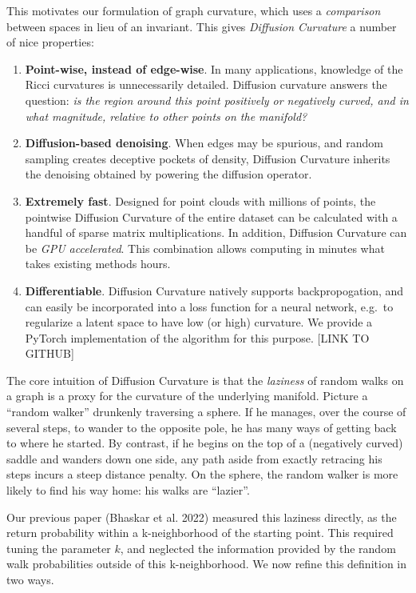\documentclass[
  letterpaper,
  DIV=11,
  numbers=noendperiod]{scrartcl}
\theoremstyle{plain}
\theoremstyle{plain}
\theoremstyle{definition}
\theoremstyle{definition}
\theoremstyle{remark}
\begin{document}
This motivates our formulation of graph curvature, which uses a
\emph{comparison} between spaces in lieu of an invariant. This gives
\emph{Diffusion Curvature} a number of nice properties:

\begin{enumerate}
\def\labelenumi{\arabic{enumi}.}
\item
  \textbf{Point-wise, instead of edge-wise}. In many applications,
  knowledge of the Ricci curvatures is unnecessarily detailed. Diffusion
  curvature answers the question: \emph{is the region around this point
  positively or negatively curved, and in what magnitude, relative to
  other points on the manifold?}
\item
  \textbf{Diffusion-based denoising}. When edges may be spurious, and
  random sampling creates deceptive pockets of density, Diffusion
  Curvature inherits the denoising obtained by powering the diffusion
  operator.
\item
  \textbf{Extremely fast}. Designed for point clouds with millions of
  points, the pointwise Diffusion Curvature of the entire dataset can be
  calculated with a handful of sparse matrix multiplications. In
  addition, Diffusion Curvature can be \emph{GPU accelerated}. This
  combination allows computing in minutes what takes existing methods
  hours.
\item
  \textbf{Differentiable}. Diffusion Curvature natively supports
  backpropogation, and can easily be incorporated into a loss function
  for a neural network, e.g.~to regularize a latent space to have low
  (or high) curvature. We provide a PyTorch implementation of the
  algorithm for this purpose. {[}LINK TO GITHUB{]}
\end{enumerate}

The core intuition of Diffusion Curvature is that the \emph{laziness} of
random walks on a graph is a proxy for the curvature of the underlying
manifold. Picture a ``random walker'' drunkenly traversing a sphere. If
he manages, over the course of several steps, to wander to the opposite
pole, he has many ways of getting back to where he started. By contrast,
if he begins on the top of a (negatively curved) saddle and wanders down
one side, any path aside from exactly retracing his steps incurs a steep
distance penalty. On the sphere, the random walker is more likely to
find his way home: his walks are ``lazier''.

Our previous paper (Bhaskar et al. 2022) measured this laziness
directly, as the return probability within a k-neighborhood of the
starting point. This required tuning the parameter \(k\), and neglected
the information provided by the random walk probabilities outside of
this k-neighborhood. We now refine this definition in two ways.
\end{document}
